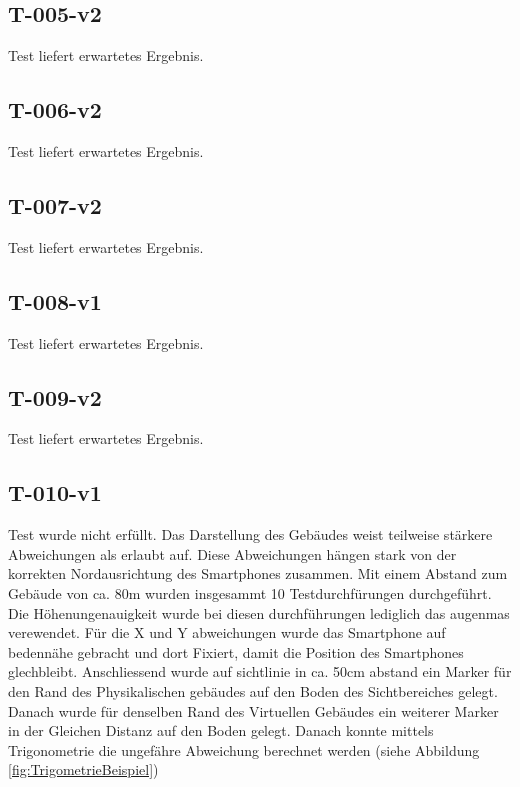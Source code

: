 \documentclass[a4paper]{scrreprt}
\begin{document}
\subsection*{T-005-v2}
Test liefert erwartetes Ergebnis.
\subsection*{T-006-v2}
Test liefert erwartetes Ergebnis.
\subsection*{T-007-v2}
Test liefert erwartetes Ergebnis.
\subsection*{T-008-v1}
Test liefert erwartetes Ergebnis.
\subsection*{T-009-v2}
Test liefert erwartetes Ergebnis.
\subsection*{T-010-v1}
Test wurde nicht erfüllt.
Das Darstellung des Gebäudes weist teilweise stärkere Abweichungen als erlaubt auf. Diese Abweichungen hängen stark von der korrekten Nordausrichtung des Smartphones zusammen.
Mit einem Abstand zum Gebäude von ca. 80m wurden insgesammt 10 Testdurchfürungen durchgeführt. Die Höhenungenauigkeit wurde bei diesen durchführungen lediglich das augenmas verewendet. Für die X und Y abweichungen wurde das Smartphone auf bedennähe gebracht und dort Fixiert, damit die Position des Smartphones glechbleibt. Anschliessend wurde auf sichtlinie in ca. 50cm abstand ein Marker für den Rand des Physikalischen gebäudes auf den Boden des Sichtbereiches gelegt. Danach wurde für denselben Rand des Virtuellen Gebäudes ein weiterer Marker in der Gleichen Distanz auf den Boden gelegt. Danach konnte mittels Trigonometrie die ungefähre Abweichung berechnet werden (siehe Abbildung \ref{fig:TrigometrieBeispiel})
\end{document}
